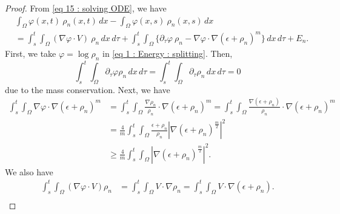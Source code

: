\documentclass{amsart}
\numberwithin{equation}{section}
\begin{document}
\begin{proof}
From \eqref{eq 15 : solving ODE}, we have
\begin{equation}\label{eq 1 : Energy : splitting}
\begin{aligned}
&\int_{\Omega}\varphi(x,t) ~\rho_n(x,t)\,dx - \int_{\Omega}\varphi(x,s) ~\rho_n(x,s)\,dx\\
  &=  \int_{s}^{t} \int_{\Omega}  ( \nabla   \varphi \cdot V) ~\rho_n \,dx \,d\tau
 + \int_{s}^{t} \int_{\Omega}  \{ \partial_\tau \varphi ~ \rho_n - \nabla \varphi
\cdot \nabla (\epsilon +\rho_n)^m \}\,dx \,d\tau + E_n.
\end{aligned}
\end{equation}
First, we take $\varphi=\log \rho_n$ in \eqref{eq 1 : Energy : splitting}. Then, 
\begin{equation*}
\int_s^t\int_\Omega \partial_\tau \varphi \rho_n \,dx \,d\tau =\int_s^t\int_\Omega \partial_\tau \rho_n\,dx \,d\tau =0
\end{equation*}
due to the mass conservation. Next, we have
\begin{equation*}
\begin{aligned}
\int_{s}^{t}\int_{\Omega} \nabla \varphi \cdot \nabla (\epsilon+\rho_n)^m &=\int_{s}^{t}\int_{\Omega} \frac{\nabla \rho_n}{\rho_n} \cdot \nabla(\epsilon+\rho_n)^m=\int_{s}^{t}\int_{\Omega} \frac{\nabla(\epsilon+\rho_n)}{\rho_n}\cdot \nabla (\epsilon+\rho_n)^m\\
&= \frac{4}{m}\int_{s}^{t}\int_{\Omega} \frac{\epsilon+\rho_n}{\rho_n}\left | \nabla(\epsilon+\rho_n)^{\frac{m}{2}}\right |^2 \\
&\geq \frac{4}{m}\int_{s}^{t}\int_{\Omega} \left | \nabla(\epsilon+\rho_n)^{\frac{m}{2}}\right |^2.
\end{aligned}
\end{equation*}
We also have
\begin{equation*}
\begin{aligned}
\int_{s}^{t}\int_{\Omega} \left(\nabla \varphi \cdot V \right)\rho_n& =\int_{s}^{t}\int_{\Omega} V \cdot \nabla \rho_n =\int_{s}^{t}\int_{\Omega} V\cdot \nabla (\epsilon+\rho_n).\\
\end{aligned}
\end{equation*}

\end{proof}
\end{document}
